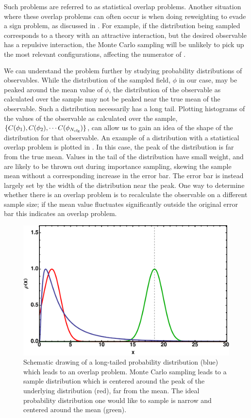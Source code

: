 Such problems are referred to as statistical overlap problems. Another situation where these overlap problems can often occur is when doing reweighting to evade a sign problem, as discussed in . For example, if the distribution being sampled corresponds to a theory with an attractive interaction, but the desired observable has a repulsive interaction, the Monte Carlo sampling will be unlikely to pick up the most relevant configurations, affecting the numerator of .

We can understand the problem further by studying probability distributions of observables. While the distribution of the sampled field, $\phi$ in our case, may be peaked around the mean value of $\phi$, the distribution of the observable as calculated over the sample may not be peaked near the true mean of the observable. Such a distribution necessarily has a long tail. Plotting histograms of the values of the observable as calculated over the sample, $\{ C(\phi_1), C(\phi_2), \cdots C(\phi_{N_{\mbox{\tiny cfg}}}) \}$, can allow us to gain an idea of the shape of the distribution for that observable. An example of a distribution with a statistical overlap problem is plotted in . In this case, the peak of the distribution is far from the true mean. Values in the tail of the distribution have small weight, and are likely to be thrown out during importance sampling, skewing the sample mean without a corresponding increase in the error bar. The error bar is instead largely set by the width of the distribution near the peak. One way to determine whether there is an overlap problem is to recalculate the observable on a different sample size; if the mean value fluctuates significantly outside the original error bar this indicates an overlap problem.

\begin{figure}
\begin{center}
\includegraphics[width=0.5\linewidth]{Chapter5-figures/overlap.pdf}
\end{center}
\caption{\label{fig:overlap}Schematic drawing of a long-tailed probability distribution (blue) which leads to an overlap problem. Monte Carlo sampling leads to a sample distribution which is centered around the peak of the underlying distribution (red), far from the mean. The ideal probability distribution one would like to sample is narrow and centered around the mean (green).}
\end{figure}

